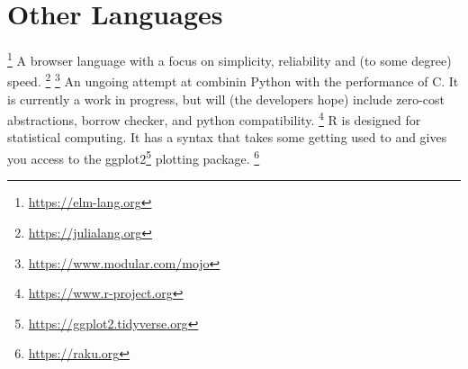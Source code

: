 \section{Other Languages}

\begin{itemize}
  \footnote{\url{https://elm-lang.org}} A  browser language with a focus on simplicity, reliability and (to some degree) speed.
  \footnote{\url{https://julialang.org}}
  \footnote{\url{https://www.modular.com/mojo}} An ungoing attempt at combinin Python with the performance of C. It is currently a work in progress, but will (the developers hope) include zero-cost abstractions, borrow checker, and python compatibility.
  \footnote{\url{https://www.r-project.org}} R is designed for statistical computing. It has a syntax that takes some getting used to and gives you access to the ggplot2\footnote{\url{https://ggplot2.tidyverse.org}} plotting package.
  \footnote{\url{https://raku.org}}
\end{itemize}
